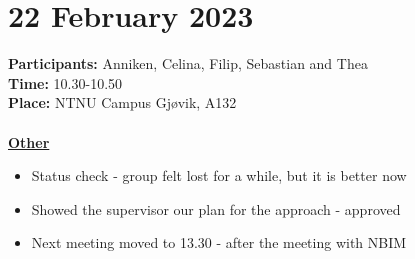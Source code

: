 \section{22 February 2023}
\textbf{Participants:} Anniken, Celina, Filip, Sebastian and Thea \\
\textbf{Time:} 10.30-10.50 \\
\textbf{Place:} NTNU Campus Gjøvik, A132
\\~\\
\textbf{\underline{Other}}
\begin{itemize}
    \item Status check - group felt lost for a while, but it is better now
    \item Showed the supervisor our plan for the approach - approved
    \item Next meeting moved to 13.30 - after the meeting with NBIM
\end{itemize}